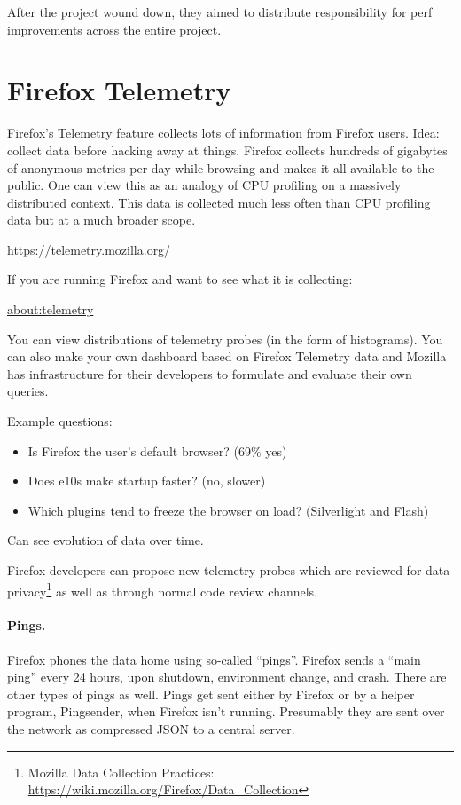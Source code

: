 After the project wound down, they aimed to distribute responsibility for perf improvements across the entire project.

\section*{Firefox Telemetry}
Firefox's Telemetry feature collects lots of information from Firefox
users.  Idea: collect data before hacking away at things.  Firefox collects hundreds of
gigabytes of anonymous metrics per day while browsing and makes it all available to
the public.  One can view this as an analogy of CPU profiling on a
massively distributed context. This data is collected much less often than
CPU profiling data but at a much broader scope.
\begin{center}
\url{https://telemetry.mozilla.org/}
\end{center}
If you are running Firefox and want to see what it is collecting:
\begin{center}
\url{about:telemetry}
\end{center}

You can view distributions of telemetry probes (in the form of
histograms). You can also make your own dashboard based on Firefox
Telemetry data and Mozilla has infrastructure for their developers to
formulate and evaluate their own queries.

Example questions:
\begin{itemize}[noitemsep]
\item Is Firefox the user's default browser? (69\% yes)
\item Does e10s make startup faster? (no, slower)
\item Which plugins tend to freeze the browser on load? (Silverlight and Flash)
\end{itemize}
Can see evolution of data over time.

Firefox developers can propose new telemetry probes which are reviewed
for data privacy\footnote{Mozilla Data Collection Practices: \url{https://wiki.mozilla.org/Firefox/Data_Collection}} as well as through normal code review channels.

\paragraph{Pings.} Firefox phones the data home using so-called ``pings''.
Firefox sends a ``main ping'' every 24 hours, upon shutdown, environment change,
and crash. There are other types of pings as well. Pings get sent either by Firefox
or by a helper program, Pingsender, when Firefox isn't running. Presumably they
are sent over the network as compressed JSON to a central server.

